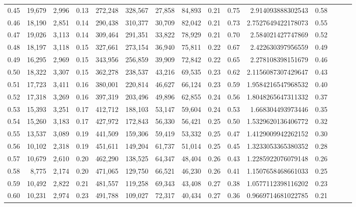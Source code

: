 \begin{tabular}{rrrrrrrrrrrrrrr}
0.45 &  19,679 &  2,996 &  0.13 &  272,248 &  328,567 &   27,858 &   84,893 &  0.21 &  0.75 &       2.914093888302543 &      0.58 \\
0.46 &  18,190 &  2,851 &  0.14 &  290,438 &  310,377 &   30,709 &   82,042 &  0.21 &  0.73 &      2.7527649422178073 &      0.55 \\
0.47 &  19,026 &  3,113 &  0.14 &  309,464 &  291,351 &   33,822 &   78,929 &  0.21 &  0.70 &       2.584021427747869 &      0.52 \\
0.48 &  18,197 &  3,118 &  0.15 &  327,661 &  273,154 &   36,940 &   75,811 &  0.22 &  0.67 &       2.422630397956559 &      0.49 \\
0.49 &  16,295 &  2,969 &  0.15 &  343,956 &  256,859 &   39,909 &   72,842 &  0.22 &  0.65 &       2.278108398151679 &      0.46 \\
0.50 &  18,322 &  3,307 &  0.15 &  362,278 &  238,537 &   43,216 &   69,535 &  0.23 &  0.62 &      2.1156087307429647 &      0.43 \\
0.51 &  17,723 &  3,411 &  0.16 &  380,001 &  220,814 &   46,627 &   66,124 &  0.23 &  0.59 &      1.9584216547968532 &      0.40 \\
0.52 &  17,318 &  3,269 &  0.16 &  397,319 &  203,496 &   49,896 &   62,855 &  0.24 &  0.56 &      1.8048265647311332 &      0.37 \\
0.53 &  15,393 &  3,251 &  0.17 &  412,712 &  188,103 &   53,147 &   59,604 &  0.24 &  0.53 &       1.668304493973446 &      0.35 \\
0.54 &  15,260 &  3,183 &  0.17 &  427,972 &  172,843 &   56,330 &   56,421 &  0.25 &  0.50 &      1.5329620136406772 &      0.32 \\
0.55 &  13,537 &  3,089 &  0.19 &  441,509 &  159,306 &   59,419 &   53,332 &  0.25 &  0.47 &      1.4129009942262152 &      0.30 \\
0.56 &  10,102 &  2,318 &  0.19 &  451,611 &  149,204 &   61,737 &   51,014 &  0.25 &  0.45 &      1.3233053365380352 &      0.28 \\
0.57 &  10,679 &  2,610 &  0.20 &  462,290 &  138,525 &   64,347 &   48,404 &  0.26 &  0.43 &      1.2285922076079148 &      0.26 \\
0.58 &   8,775 &  2,174 &  0.20 &  471,065 &  129,750 &   66,521 &   46,230 &  0.26 &  0.41 &      1.1507658468661033 &      0.25 \\
0.59 &  10,492 &  2,822 &  0.21 &  481,557 &  119,258 &   69,343 &   43,408 &  0.27 &  0.38 &      1.0577112398116202 &      0.23 \\
0.60 &  10,231 &  2,974 &  0.23 &  491,788 &  109,027 &   72,317 &   40,434 &  0.27 &  0.36 &      0.9669714681022785 &      0.21 \\

\end{tabular}
